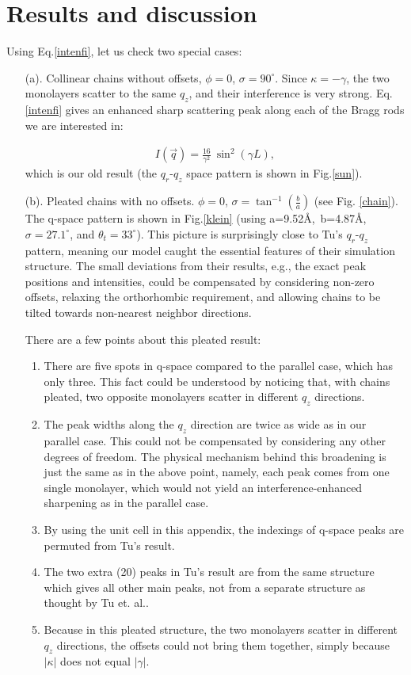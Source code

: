 \section{Results and discussion}

Using Eq.\ref{intenfi}, let us check two special cases: 

\begin{itemize}

\item[(a).] Collinear chains without offsets, $\phi = 0$,
$\sigma = 90^{\circ}$. Since $\kappa = - \gamma$, the two monolayers
scatter to the same $q_z$, and their interference is very strong. Eq. 
\ref{intenfi} gives an enhanced sharp scattering peak along each
of the Bragg rods we are interested in:

\begin{eqnarray}
\label{colin}
I(\vec{q}) = \frac{16}{\gamma^2}\ \sin^{2}(\gamma L),
\end{eqnarray}
which is our old result (the $q_{r}$-$q_{z}$ space pattern is shown
in Fig.\ref{sun}). 

\item[(b).] Pleated chains with no offsets. 
$\phi = 0$, $\sigma = \tan^{-1}(\frac{b}{a})$ (see Fig. \ref{chain}).
The q-space pattern is shown in Fig.\ref{klein} (using 
a=9.52\AA,\ b=4.87\AA,\ $\sigma=27.1^{\circ}$, and $\theta_{t}=33^{\circ}$).
This picture is surprisingly close to Tu's $q_r$-$q_z$ pattern, meaning 
our model caught the essential features of their simulation structure. The small
deviations from their results, e.g., the exact peak positions and intensities,
could be compensated by considering non-zero offsets, relaxing the orthorhombic
requirement, and allowing chains to be tilted towards non-nearest neighbor
directions. 

There are a few points about this pleated result:
\begin{enumerate}
\item There are five spots in q-space compared to the parallel case, which 
has only three. This fact could be understood by noticing that, with chains
pleated, two opposite monolayers scatter in different $q_z$ directions.
\item The peak widths along the $q_{z}$ direction are twice as wide as in our 
parallel case. This could not be compensated by considering any other degrees
of freedom. The physical mechanism behind this broadening is just the same
as in the above point, namely, each peak comes from one single monolayer, which
would not yield an interference-enhanced sharpening as in the parallel
case.
\item By using the unit cell in this appendix, the indexings of q-space
peaks are permuted from Tu's result.
\item The two extra (20) peaks in Tu's result are from the same 
structure which gives all other main peaks, not from a separate structure
as thought by Tu et. al..
\item Because in this pleated structure, the two monolayers scatter in
different $q_z$ directions, the offsets could not bring them together,
simply because $|\kappa|$ does not equal $|\gamma|$. 
\end{enumerate}


\end{itemize}
